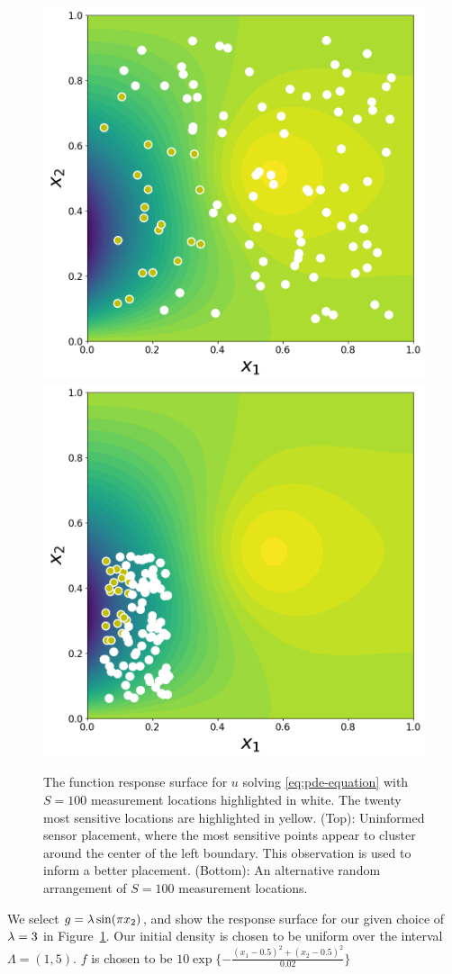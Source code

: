 \begin{figure}[htbp]
\centering
  \includegraphics[width=0.475\linewidth]{figures/pde/pde_reference_solution}
  \includegraphics[width=0.475\linewidth]{figures/pde/pde-alt_reference_solution}
\caption{The function response surface for $u$ solving \eqref{eq:pde-equation} with $S=100$ measurement locations highlighted in white.
The twenty most sensitive locations are highlighted in yellow.
(Top): Uninformed sensor placement, where the most sensitive points  appear to cluster around the center of the  left boundary.
This observation is used to inform a better placement.
(Bottom): An alternative random arrangement of $S=100$ measurement locations.
}
\label{fig:pde-ref-solution}
\end{figure}
We select $g=\lambda \sin(\pi x_2)$, and show the response surface for our given choice of $\lambda = 3$ in Figure~\ref{fig:pde-ref-solution}.
Our initial density is chosen to be uniform over the interval $\Lambda = (1,5)$.
$f$ is chosen to be $10\exp\{-\frac{(x_1-0.5)^2 + (x_2 - 0.5)^2}{0.02}\}$



